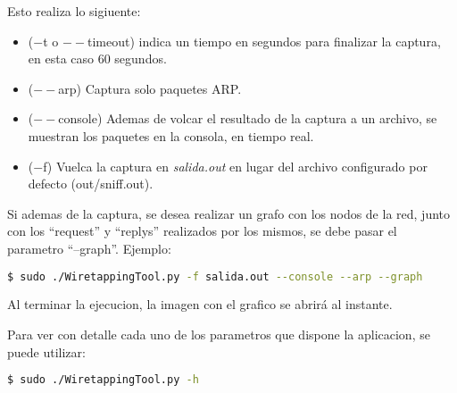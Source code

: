 Esto realiza lo sigiuente:

\begin{itemize}
	\item ($-$t o $--$timeout) indica un tiempo en segundos para finalizar la captura, en esta caso 60 segundos.
	\item ($--$arp) Captura solo paquetes ARP.
	\item ($--$console) Ademas de volcar el resultado de la captura a un archivo, se muestran los paquetes en la consola, en tiempo real.
	\item ($-$f) Vuelca la captura en \textit{salida.out} en lugar del archivo configurado por defecto (out/sniff.out).
\end{itemize}

Si ademas de la captura, se desea realizar un grafo con los nodos de la red, junto con los ``request'' y ``replys'' realizados por los mismos, se debe pasar el parametro ``--graph''. Ejemplo:

\begin{lstlisting}[language=bash]
  $ sudo ./WiretappingTool.py -f salida.out --console --arp --graph
\end{lstlisting}

Al terminar la ejecucion, la imagen con el grafico se abrirá al instante.

Para ver con detalle cada uno de los parametros que dispone la aplicacion, se puede utilizar:

\begin{lstlisting}[language=bash]
  $ sudo ./WiretappingTool.py -h
\end{lstlisting}